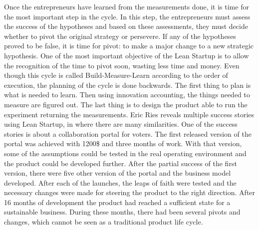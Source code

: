 Once the entrepreneurs have learned from the measurements done, it is time for the most important step in the cycle. In this step, the entrepreneurs must assess the success of the hypotheses and based on these assessments, they must decide whether to pivot the original strategy or persevere. If any of the hypotheses proved to be false, it is time for pivot: to make a major change to a new strategic hypothesis. One of the most important objective of the Lean Startup is to allow the recognition of the time to pivot soon, wasting less time and money.
Even though this cycle is called Build-Measure-Learn according to the order of execution, the planning of the cycle is done backwards. The first thing to plan is what is needed to learn. Then using innovation accounting, the things needed to measure are figured out. The last thing is to design the product able to run the experiment returning the measurements.
 Eric Ries reveals multiple success stories using Lean Startup, in where there are many similarities. One of the success stories is about a collaboration portal for voters. The first released version of the portal was achieved with 1200\$ and three months of work. With that version, some of the assumptions could be tested in the real operating environment and the product could be developed further. After the partial success of the first version, there were five other version of the portal and the business model developed. After each of the launches, the leaps of faith were tested and the necessary changes were made for steering the product to the right direction. After 16 months of development the product had reached a sufficient state for a sustainable business. During these months, there had been several pivots and changes, which cannot be seen as a traditional product life cycle.





 
 
